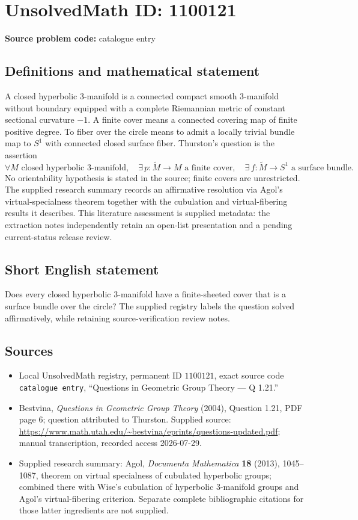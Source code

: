 \documentclass[11pt]{article}
\begin{document}
\section*{UnsolvedMath ID: 1100121}
\textbf{Source problem code:} catalogue entry
\subsection{Definitions and mathematical statement}
A closed hyperbolic \(3\)-manifold is a connected compact smooth \(3\)-manifold without boundary equipped with a complete Riemannian metric of constant sectional curvature \(-1\). A finite cover means a connected covering map of finite positive degree. To fiber over the circle means to admit a locally trivial bundle map to \(S^1\) with connected closed surface fiber. Thurston's question is the assertion
\[
\forall M\text{ closed hyperbolic }3\text{-manifold},\quad
\exists\,p:\widetilde M\longrightarrow M\text{ a finite cover},\quad
\exists\,f:\widetilde M\longrightarrow S^1\text{ a surface bundle}.
\]
No orientability hypothesis is stated in the source; finite covers are unrestricted. The supplied research summary records an affirmative resolution via Agol's virtual-specialness theorem together with the cubulation and virtual-fibering results it describes. This literature assessment is supplied metadata: the extraction notes independently retain an open-list presentation and a pending current-status release review.
\subsection{Short English statement}
Does every closed hyperbolic \(3\)-manifold have a finite-sheeted cover that is a surface bundle over the circle? The supplied registry labels the question solved affirmatively, while retaining source-verification review notes.
\subsection{Sources}
\begin{itemize}
\item Local UnsolvedMath registry, permanent ID \(1100121\), exact source code \texttt{catalogue entry}, ``Questions in Geometric Group Theory --- Q 1.21.''
\item Bestvina, \emph{Questions in Geometric Group Theory} (2004), Question 1.21, PDF page 6; question attributed to Thurston. Supplied source: \url{https://www.math.utah.edu/~bestvina/eprints/questions-updated.pdf}; manual transcription, recorded access 2026-07-29.
\item Supplied research summary: Agol, \emph{Documenta Mathematica} \textbf{18} (2013), 1045--1087, theorem on virtual specialness of cubulated hyperbolic groups; combined there with Wise's cubulation of hyperbolic \(3\)-manifold groups and Agol's virtual-fibering criterion. Separate complete bibliographic citations for those latter ingredients are not supplied.
\end{itemize}
\end{document}
